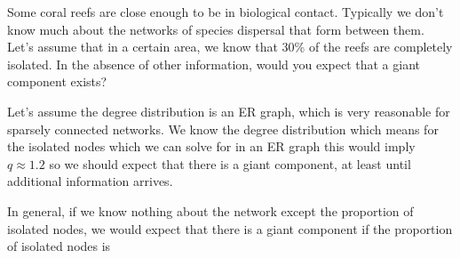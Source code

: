 Some coral reefs are close enough to be in biological contact. Typically we don't know much about the networks of species dispersal that form between them. Let's assume that in a certain area, we know that 30\% of the reefs are completely isolated. In the absence of other information, would you expect that a giant component exists?

\solution 
Let's assume the degree distribution is an ER graph, which is very reasonable for sparsely connected networks. We know the degree distribution 
which means for the isolated nodes 
which we can solve for
in an ER graph this would imply $q\approx 1.2$ so we should expect that there is a giant component, at least until additional information arrives. 

In general, if we know nothing about the network except the proportion of isolated nodes, we would expect that there is a giant component if the proportion of isolated nodes is 


